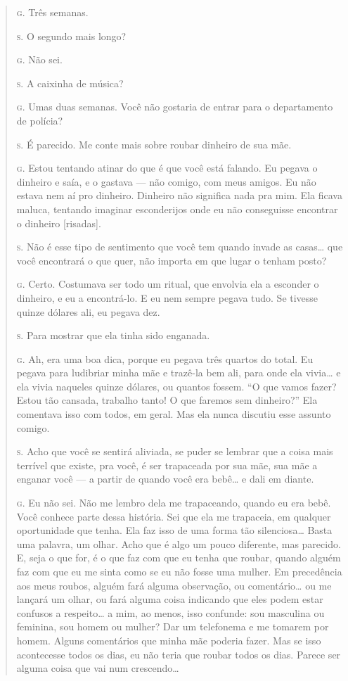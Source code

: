 \begin{quote}
\noindent\hskip0mm\textsc{g.} Três semanas.

\noindent\hskip0mm\textsc{s.} O segundo mais longo?

\noindent\hskip0mm\textsc{g.} Não sei.

\noindent\hskip0mm\textsc{s.} A caixinha de música?

\noindent\hskip0mm\textsc{g.} Umas duas semanas. Você não gostaria de entrar para o departamento de
polícia?

\noindent\hskip0mm\textsc{s.} É parecido. Me conte mais sobre roubar dinheiro de sua mãe.

\noindent\hskip0mm\textsc{g.} Estou tentando atinar do que é que você está falando. Eu pegava o
dinheiro e saía, e o gastava --- não comigo, com meus amigos. Eu não
estava nem aí pro dinheiro. Dinheiro não significa nada pra mim. Ela
ficava maluca, tentando imaginar esconderijos onde eu não conseguisse
encontrar o dinheiro [risadas].

\noindent\hskip0mm\textsc{s.} Não é esse tipo de sentimento que você tem quando invade as casas\ldots{}
que você encontrará o que quer, não importa em que lugar o tenham
posto?

\noindent\hskip0mm\textsc{g.} Certo. Costumava ser todo um ritual, que envolvia ela a esconder o
dinheiro, e eu a encontrá-lo. E eu nem sempre pegava tudo. Se tivesse
quinze dólares ali, eu pegava dez.

\noindent\hskip0mm\textsc{s.} Para mostrar que ela tinha sido enganada.

\noindent\hskip0mm\textsc{g.} Ah, era uma boa dica, porque eu pegava três quartos do total. Eu
pegava para ludibriar minha mãe e trazê-la bem ali, para onde ela
vivia\ldots{} e ela vivia naqueles quinze dólares, ou quantos fossem.
``O que vamos fazer? Estou tão cansada, trabalho tanto! O
que faremos sem dinheiro?'' Ela comentava isso com todos,
em geral. Mas ela nunca discutiu esse assunto comigo.

\noindent\hskip0mm\textsc{s.} Acho que você se sentirá aliviada, se puder se lembrar que a coisa
mais terrível que existe, pra você, é ser trapaceada por sua mãe, sua
mãe a enganar você --- a partir de quando você era bebê\ldots{} e dali em
diante.

\noindent\hskip0mm\textsc{g.} Eu não sei. Não me lembro dela me trapaceando, quando eu era bebê.
Você conhece parte dessa história. Sei que ela me trapaceia, em
qualquer oportunidade que tenha. Ela faz isso de uma forma tão
silenciosa\ldots{} Basta uma palavra, um olhar. Acho que é algo um pouco
diferente, mas parecido. E, seja o que for, é o que faz com que eu
tenha que roubar, quando alguém faz com que eu me sinta como se eu não
fosse uma mulher. Em precedência aos meus roubos, alguém fará alguma
observação, ou comentário\ldots{} ou me lançará um olhar, ou fará alguma
coisa indicando que eles podem estar confusos a respeito\ldots{} a mim, ao
menos, isso confunde: sou masculina ou feminina, sou homem ou mulher?
Dar um telefonema e me tomarem por homem. Alguns comentários que minha
mãe poderia fazer. Mas se isso acontecesse todos os dias, eu não teria
que roubar todos os dias. Parece ser alguma coisa que vai num
crescendo\ldots{}


\end{quote}

